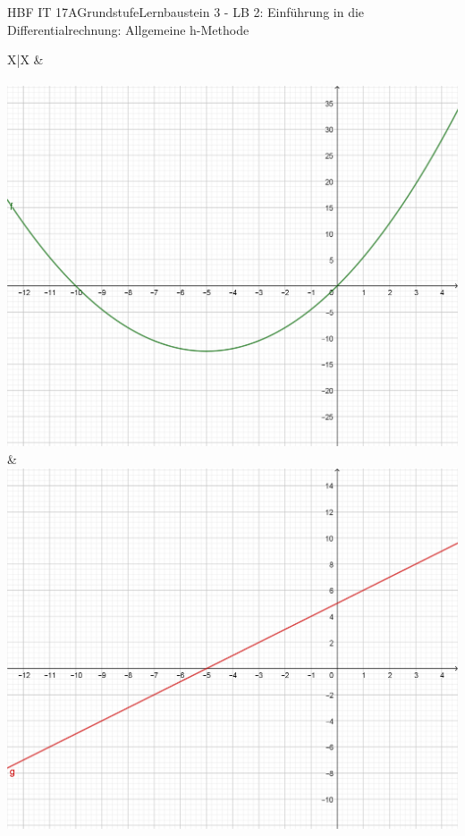 \documentclass[oneside,openany,headings=optiontotoc,11pt,numbers=noenddot]{scrreprt}
\begin{document}
	\begin{worksheet}{HBF IT 17A}{Grundstufe}{Lernbaustein 3 - LB 2: Einführung in die Differentialrechnung: Allgemeine h-Methode}
		
		\noindent
		\begin{framed}
			\begin{center}
				\begin{tabularx}{\textwidth}{X|X}
					 & \\
					\\
					\includegraphics[scale=0.25]{Bilder/f.png} & \includegraphics[scale=0.25]{Bilder/f'.png}\\
				\end{tabularx}
			\end{center}
		\end{framed}
	

\end{worksheet}
\end{document}
